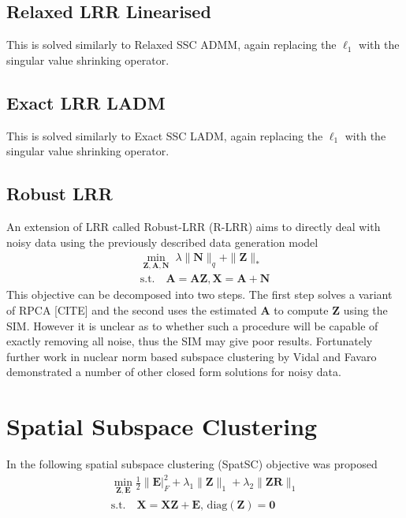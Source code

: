 \documentclass{article}
\begin{document}
\subsection{Relaxed LRR Linearised}

This is solved similarly to Relaxed SSC ADMM, again replacing the $\ell_1$ with the singular value shrinking operator.

\subsection{Exact LRR LADM}

This is solved similarly to Exact SSC LADM, again replacing the $\ell_1$ with the singular value shrinking operator.

\subsection{Robust LRR}

An extension of LRR called Robust-LRR (R-LRR) aims to directly deal with noisy data using the previously described data generation model
\begin{align}
\min_{\mathbf {Z, A, N}} \; \lambda \|\mathbf{N}\|_{q} + \|\mathbf Z\|_{*} \\
\text{s.t.} \quad \mathbf{A = AZ, X = A + N} \nonumber
\end{align}
This objective can be decomposed into two steps. The first step solves a variant of RPCA [CITE] and the second uses the estimated $\mathbf A$ to compute $\mathbf Z$ using the SIM. However it is unclear as to whether such a procedure will be capable of exactly removing all noise, thus the SIM may give poor results. Fortunately further work in nuclear norm based subspace clustering by Vidal and Favaro \cite{Vidal201447} demonstrated a number of other closed form solutions for noisy data.

\newpage
\section{Spatial Subspace Clustering}

In \cite{Guo.Y;Gao.J;Li.F-2013} the following spatial subspace clustering (SpatSC) objective was proposed
\begin{align}
\label{YiGuo1}
\min_{\mathbf Z, \mathbf E} \frac12\|\mathbf E|^2_F +\lambda_1\|\mathbf Z\|_{1}+\lambda_2\|\mathbf Z\mathbf R\|_{1} \\
\text{s.t.} \quad \mathbf{X = XZ + E}\text{, diag}(\mathbf Z) = \mathbf 0 \nonumber
\end{align}
\end{document}
